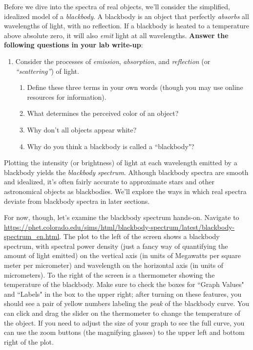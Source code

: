 \documentclass[11pt]{article}
\begin{document}
Before we dive into the spectra of real objects, we'll consider the simplified, idealized model of a \emph{blackbody}. A blackbody is an object that perfectly \emph{absorbs} all wavelengths of light, with no reflection. If a blackbody is heated to a temperature above absolute zero, it will also \emph{emit} light at all wavelengths. \textbf{Answer the following questions in your lab write-up}:
\begin{enumerate}
    \item Consider the processes of \emph{emission}, \emph{absorption}, and \emph{reflection} (or \emph{``scattering''}) of light.
    \begin{enumerate}
        \item Define these three terms in your own words (though you may use online resources for information).

        \item What determines the perceived color of an object?

        \item Why don't all objects appear white?

        \item Why do you think a blackbody is called a ``blackbody"?
    \end{enumerate} 
    
\end{enumerate}

Plotting the intensity (or brightness) of light at each wavelength emitted by a blackbody yields the \emph{blackbody spectrum}. Although blackbody spectra are smooth and idealized, it's often fairly accurate to approximate stars and other astronomical objects as blackbodies. We'll explore the ways in which real spectra deviate from blackbody spectra in later sections.

\bigskip

For now, though, let's examine the blackbody spectrum hands-on. Navigate to \url{https://phet.colorado.edu/sims/html/blackbody-spectrum/latest/blackbody-spectrum_en.html}. The plot to the left of the screen shows a blackbody spectrum, with spectral power density (just a fancy way of quantifying the amount of light emitted) on the vertical axis (in units of Megawatts per square meter per micrometer) and wavelength on the horizontal axis (in units of micrometers). To the right of the screen is a thermometer showing the temperature of the blackbody. Make sure to check the boxes for ``Graph Values" and ``Labels" in the box to the upper right; after turning on these features, you should see a pair of yellow numbers labeling the \emph{peak} of the blackbody curve. You can click and drag the slider on the thermometer to change the temperature of the object. If you need to adjust the size of your graph to see the full curve, you can use the zoom buttons (the magnifying glasses) to the upper left and bottom right of the plot.
\end{document}
